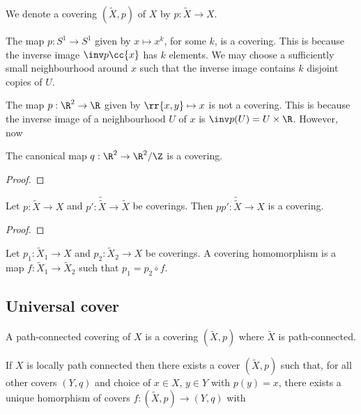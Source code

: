 \documentclass{article}
\begin{document}
\begin{notation}
  We denote a covering $(\tilde X,p)$ of $X$ by $p:\tilde X\to X$.
\end{notation}

\begin{example}
  The map $p:S^1\to S^1$ given by $x\mapsto x^k$, for some $k$, is a covering.
  This is because the inverse image $\inv p\cc{x}$ has $k$
  elements. We may choose a sufficiently small neighbourhood around $x$
  such that the inverse image contains $k$ disjoint copies of $U$.
\end{example}

\begin{example}
  The map $p:\R^2\to\R$ given by $\rr{x,y}\mapsto x$ is not a covering.
  This is because the inverse image of a neighbourhood $U$ of $x$
  is $\inv p(U) = U\times\R$. However, now 
\end{example}

\begin{example}
  The canonical map $q:\R^2\to\R^2/\Z$ is a covering.
  \begin{proof}
    \missingproof
  \end{proof}
\end{example}

\begin{proposition}
  Let $p:\tilde X\to X$ and $p':\tilde{\tilde X}\to\tilde X$ be coverings.
  Then $pp':\tilde{\tilde{X}}\to X$ is a covering.
  \begin{proof}
    \missingproof
  \end{proof}
\end{proposition}

\begin{definition}
  Let $p_1:\tilde X_1\to X$ and $p_2:\tilde X_2\to X$ be coverings. A covering homomorphism
  is a map $f:\tilde X_1\to\tilde X_2$ such that $p_1 = p_2\circ f$.
\end{definition}

\subsection{Universal cover}

\begin{definition}
  A path-connected covering of $X$ is a covering $(\tilde X,p)$ where $\tilde X$ is
  path-connected.
\end{definition}

\begin{theorem}
  If $X$ is locally path connected then there exists a cover
  $(\tilde X,p)$ such that, for all other covers $(Y,q)$ and choice of $x\in X$, $y\in Y$
  with $p(y)=x$, there exists a unique homorphism of covers $f:(\tilde X,p)\to(Y,q)$
  with 
\end{theorem}
\end{document}
